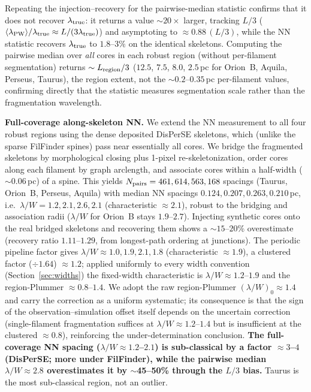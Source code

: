 \documentclass[usenatbib,twoside,twocolumn]{mnras}
\begin{document}
Repeating the injection--recovery for the pairwise-median statistic confirms that it does not recover $\lambda_{\rm true}$: it returns a value $\sim$$20\times$ larger, tracking $L/3$ ($\langle\lambda_{\rm PW}\rangle/\lambda_{\rm true}\approx L/(3\lambda_{\rm true})$) and asymptoting to $\approx0.88\,(L/3)$, while the NN statistic recovers $\lambda_{\rm true}$ to $1.8$--$3\%$ on the identical skeletons. Computing the pairwise median over \emph{all} cores in each robust region (without per-filament segmentation) returns $\sim L_{\rm region}/3$ ($12.5$, $7.5$, $8.0$, $2.5$\,pc for Orion~B, Aquila, Perseus, Taurus), the region extent, not the $\sim0.2$--$0.35$\,pc per-filament values, confirming directly that the statistic measures segmentation scale rather than the fragmentation wavelength.

\textbf{Full-coverage along-skeleton NN.} We extend the NN measurement to all four robust regions using the dense deposited DisPerSE skeletons, which (unlike the sparse FilFinder spines) pass near essentially all cores. We bridge the fragmented skeletons by morphological closing plus 1-pixel re-skeletonization, order cores along each filament by graph arclength, and associate cores within a half-width ($\sim$0.06\,pc) of a spine. This yields $N_{\rm pairs}=461,614,563,168$ spacings (Taurus, Orion~B, Perseus, Aquila) with median NN spacings $0.124,0.207,0.263,0.210$\,pc, i.e.\ $\lambda/W=1.2,2.1,2.6,2.1$ (characteristic $\approx2.1$), robust to the bridging and association radii ($\lambda/W$ for Orion~B stays $1.9$--$2.7$). Injecting synthetic cores onto the real bridged skeletons and recovering them shows a $\sim$$15$--$20$\% overestimate (recovery ratio $1.11$--$1.29$, from longest-path ordering at junctions). The periodic pipeline factor gives $\lambda/W\approx1.0,1.9,2.1,1.8$ (characteristic $\approx1.9$), a clustered factor ($\div1.64$) $\approx1.2$; applied uniformly to every width convention (Section~\ref{sec:widths}) the fixed-width characteristic is $\lambda/W\approx1.2$--$1.9$ and the region-Plummer $\approx0.8$--$1.4$. We adopt the raw region-Plummer $(\lambda/W)_0\approx1.4$ and carry the correction as a uniform systematic; its consequence is that the sign of the observation--simulation offset itself depends on the uncertain correction (single-filament fragmentation suffices at $\lambda/W\approx1.2$--$1.4$ but is insufficient at the clustered $\approx0.8$), reinforcing the under-determination conclusion. \textbf{The full-coverage NN spacing ($\lambda/W\approx1.2$--$2.1$) is sub-classical by a factor $\approx3$--$4$ (DisPerSE; more under FilFinder), while the pairwise median $\lambda/W\approx2.8$ overestimates it by $\sim$45--50\% through the $L/3$ bias.} Taurus is the most sub-classical region, not an outlier.
\end{document}
